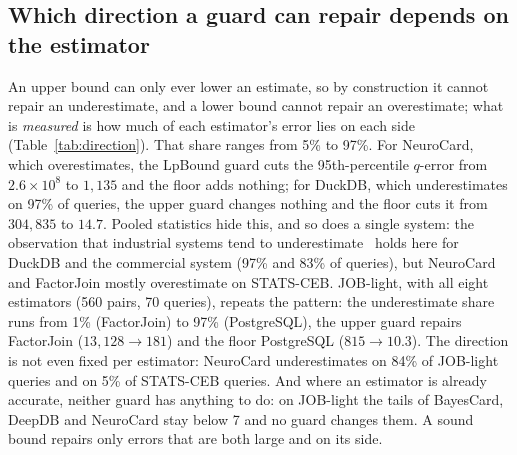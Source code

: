 \documentclass[sigconf, nonacm]{acmart}
\begin{document}
\subsection{Which direction a guard can repair depends on the estimator}
An upper bound can only ever lower an estimate, so by construction it cannot
repair an underestimate, and a lower bound cannot repair an overestimate; what
is \emph{measured} is how much of each estimator's error lies on each side
(Table~\ref{tab:direction}). That share ranges from 5\% to 97\%. For NeuroCard,
which overestimates, the LpBound guard cuts the 95th-percentile $q$-error from
$2.6\times10^{8}$ to $1{,}135$ and the floor adds nothing; for DuckDB, which
underestimates on 97\% of queries, the upper guard changes nothing and the
floor cuts it from $304{,}835$ to $14.7$. Pooled statistics hide this, and so
does a single system: the observation that industrial systems tend to
underestimate~\cite{stoian2026xbound} holds here for DuckDB and the commercial
system (97\% and 83\% of queries), but NeuroCard and FactorJoin mostly
overestimate on STATS-CEB. JOB-light, with all eight estimators (560 pairs, 70 queries),
repeats the pattern: the underestimate share runs from 1\% (FactorJoin) to
97\% (PostgreSQL), the upper guard repairs FactorJoin ($13{,}128\to181$) and
the floor PostgreSQL ($815\to10.3$). The direction is not even fixed per
estimator: NeuroCard underestimates on 84\% of JOB-light queries and on 5\% of
STATS-CEB queries. And where an estimator is already accurate, neither guard
has anything to do: on JOB-light the tails of BayesCard, DeepDB and NeuroCard
stay below 7 and no guard changes them. A sound bound repairs only errors that
are both large and on its side.
\end{document}
